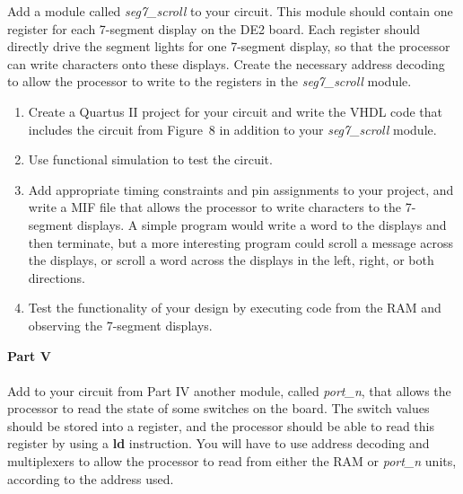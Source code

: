 \documentclass[epsfig,10pt,fullpage]{article}
\begin{document}
Add a module called {\it seg7\_scroll} to your circuit. This module should contain one
register for each 7-segment display on the DE2 board. Each register should directly drive
the segment lights for one 7-segment display, so that the processor can write characters
onto these displays. Create the necessary address decoding to allow the processor to
write to the registers in the {\it seg7\_scroll} module.

\begin{enumerate}
\item Create a Quartus II project for your circuit and write the VHDL code that
includes the circuit from Figure~8 in addition to your {\it seg7\_scroll} module.
\item Use functional simulation to test the circuit.
\item Add appropriate timing constraints and pin assignments to 
your project, and write a MIF file that allows the processor to write characters to the 
7-segment displays. A simple program would write a word to the displays and then
terminate, but a more interesting program could scroll a message across the displays, or 
scroll a word across the displays in the left, right, or both directions.
\item Test the functionality of your design by executing code from the RAM
and observing the 7-segment displays.
\end{enumerate}

\noindent
{\bf Part V}
~\\
~\\
\noindent
Add to your circuit from Part IV another module, called {\it port\_n}, that allows the 
processor to read the state of some switches on the board. The switch values should be 
stored into a register, and the processor should be able to read this register by 
using a {\bf ld} instruction. You will have to
use address decoding and multiplexers to allow the processor to read from either the RAM
or {\it port\_n} units, according to the address used.
\end{document}
